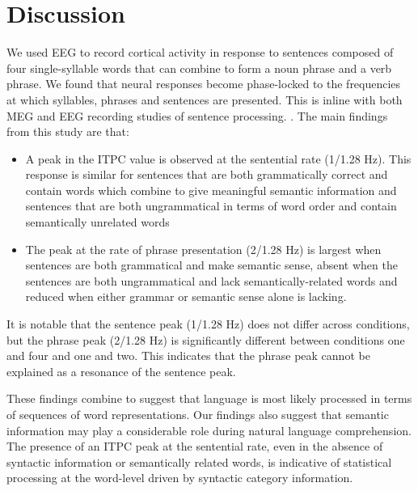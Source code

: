 \documentclass[a4paper,10pt,twoside]{article}
\begin{document}
\section*{Discussion}

We used EEG to record cortical activity in response to sentences
composed of four single-syllable words that can combine to form a noun
phrase and a verb phrase. We found that neural responses become
phase-locked to the frequencies at which syllables, phrases and
sentences are presented. This is inline with both MEG and EEG
recording studies of sentence processing.
\cite{DingEtAl2015,DingEtAl2017}. The main findings from this study
are that:
\begin{itemize}
\item A peak in the ITPC value is observed at the sentential rate
  (1/1.28 Hz). This response is similar for sentences that are both
  grammatically correct and contain words which combine to give
  meaningful semantic information and sentences that are both
  ungrammatical in terms of word order and contain semantically
  unrelated words
\item The peak at the rate of phrase presentation
  (2/1.28 Hz) is largest when sentences are both grammatical and make
  semantic sense, absent when the sentences are both ungrammatical and
  lack semantically-related words and reduced when either grammar or
  semantic sense alone is lacking. 
\end{itemize}
It is notable that the sentence peak (1/1.28 Hz) does not differ
across conditions, but the phrase peak (2/1.28 Hz) is significantly
different between conditions one and four and one and two. This indicates that the
phrase peak cannot be explained as a resonance of the sentence peak.

These findings combine to suggest that language is most likely
processed in terms of sequences of word representations. Our findings
also suggest that semantic information may play a considerable role
during natural language comprehension. The presence of an ITPC peak at
the sentential rate, even in the absence of syntactic information or
semantically related words, is indicative of statistical processing at
the word-level driven by syntactic category information.
\end{document}
